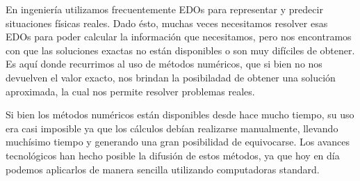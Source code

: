 \documentclass[10pt]{article}
\begin{document}
\begin{enumerate}
 En ingeniería utilizamos frecuentemente EDOs para representar y predecir situaciones físicas reales. Dado ésto, muchas veces necesitamos
 resolver esas EDOs para poder calcular la información que necesitamos, pero nos encontramos con que las soluciones exactas no están disponibles
 o son muy difíciles de obtener. Es aquí donde recurrimos al uso de métodos numéricos, que si bien no nos devuelven el valor exacto, nos brindan
 la posibiladad de obtener una solución aproximada, la cual nos permite resolver problemas reales.
 
 Si bien los métodos numéricos están disponibles desde hace mucho tiempo, su uso era casi imposible ya que los cálculos debían realizarse manualmente,
 llevando muchísimo tiempo y generando una gran posibilidad de equivocarse. Los avances tecnológicos han hecho posible la difusión de estos
 métodos, ya que hoy en día podemos aplicarlos de manera sencilla utilizando computadoras standard. 
 \end{enumerate}
\end{document}
